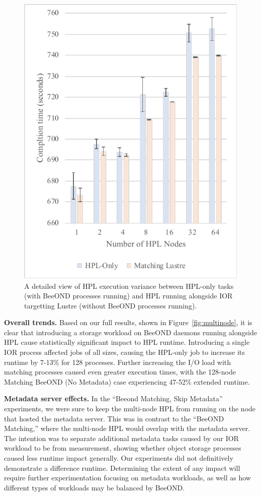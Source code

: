 \begin{figure}[htbp]
\centerline{\includegraphics{multinode-95ci-lustre-beeond}}
\caption{A detailed view of HPL execution variance between HPL-only tasks (with BeeOND processes running) and HPL running alongside IOR targetting Lustre (without BeeOND processes running).}
\label{multinode-variance}
\end{figure}

{\bf Overall trends.} Based on our full results, shown in Figure~\ref{fig:multinode}, it is clear that introducing a storage workload on BeeOND daemons running alongside HPL cause statistically significant impact to HPL runtime. Introducing a single IOR process affected jobs of all sizes, causing the HPL-only job to increase its runtime by 7-13\% for 128 processes. Further increasing the I/O load with matching processes caused even greater execution times, with the 128-node Matching BeeOND (No Metadata) case experiencing 47-52\% extended runtime.

{\bf Metadata server effects.} In the ``Beeond Matching, Skip Metadata'' experiments, we were sure to keep the multi-node HPL from running on the node that hosted the metadata server. This was in contrast to the ``BeeOND Matching,'' where the multi-node HPL would overlap with the metadata server. The intention was to separate additional metadata tasks caused by our IOR workload to be from measurement, showing whether object storage processes caused less runtime impact generally. Our experiments did not definitively demonstrate a difference runtime. Determining the extent of any impact will require further experimentation focusing on metadata workloads, as well as how different types of workloads may be balanced by BeeOND.

